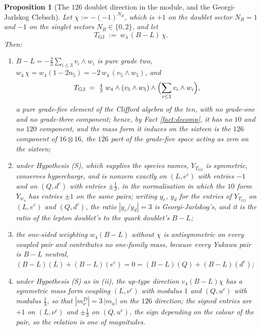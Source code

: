 \documentclass[11pt]{article}
\newtheorem{proposition}[theorem]{Proposition}
\theoremstyle{definition}
\begin{document}
\begin{proposition}[The $126$ doublet direction in the module, and the Georgi-Jarlskog Clebsch]\label{prop:126}
Let $\chi := -(-1)^{N_{R}}$, which is $+1$ on the doublet sector $N_{R} = 1$ and $-1$ on the singlet sectors $N_{R} \in \{0, 2\}$, and let
\[
T_{\mathrm{GJ}} \;:=\; w_{4}\,(B - L)\,\chi .
\]
Then:
\begin{enumerate}
\item[(i)] $B - L = -\tfrac23\sum_{i \le 3} v_{i}\wedge w_{i}$ is pure grade two, $w_{4}\,\chi = w_{4}(1 - 2n_{5}) = -2\,w_{4}\,(v_{5}\wedge w_{5})$, and
\[
T_{\mathrm{GJ}} \;=\; \tfrac43\; w_{4}\wedge (v_{5}\wedge w_{5}) \wedge \Bigl(\sum_{i\le 3} v_{i}\wedge w_{i}\Bigr),
\]
a pure grade-five element of the Clifford algebra of the ten, with no grade-one and no grade-three component; hence, by Fact \ref{fact:decomp}, it has no $10$ and no $120$ component, and the mass form it induces on the sixteen is the $126$ component of $16 \otimes 16$, the $\overline{126}$ part of the grade-five space acting as zero on the sixteen;
\item[(ii)] under Hypothesis (S), which supplies the species names, $Y_{T_{\mathrm{GJ}}}$ is symmetric, conserves hypercharge, and is nonzero exactly on $(L, e^{c})$ with entries $-1$ and on $(Q, d^{c})$ with entries $\pm\tfrac13$, in the normalisation in which the $10$ form $Y_{w_{4}}$ has entries $\pm1$ on the same pairs; writing $y_{e}$, $y_{d}$ for the entries of $Y_{T_{\mathrm{GJ}}}$ on $(L, e^{c})$ and $(Q, d^{c})$, the ratio $|y_{e}/y_{d}| = 3$ is Georgi-Jarlskog's, and it is the ratio of the lepton doublet's to the quark doublet's $B - L$;
\item[(iii)] the one-sided weighting $w_{4}(B - L)$ without $\chi$ is antisymmetric on every coupled pair and contributes no one-family mass, because every Yukawa pair is $B - L$ neutral, $(B-L)(L) + (B-L)(e^{c}) = 0 = (B-L)(Q) + (B-L)(d^{c})$;
\item[(iv)] under Hypothesis (S) as in (ii), the up-type direction $v_{4}(B - L)\chi$ has a symmetric mass form coupling $(L, \nu^{c})$ with modulus $1$ and $(Q, u^{c})$ with modulus $\tfrac13$, so that $|m_{\nu}^{D}| = 3\,|m_{u}|$ on the $126$ direction; the signed entries are $+1$ on $(L, \nu^{c})$ and $\pm\tfrac13$ on $(Q, u^{c})$, the sign depending on the colour of the pair, so the relation is one of magnitudes.
\end{enumerate}
\end{proposition}
\end{document}
